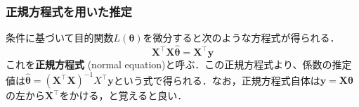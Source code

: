 \subsubsection{正規方程式を用いた推定}条件に基づいて目的関数$L(\mathbf{\theta})$を微分すると次のような方程式が得られる．
$$
\mathbf{X}^\top\mathbf{X}\mathbf{\hat\theta}=\mathbf{X}^\top\mathbf{y}
$$
これを\textbf{正規方程式} (normal equation)と呼ぶ．この正規方程式より、係数の推定値は$\mathbf{\hat\theta}={(\mathbf{X}^\top\mathbf{X})}^{-1}X^\top\mathbf{y}$という式で得られる．なお，正規方程式自体は$\mathbf{y}=\mathbf{X}\mathbf{\theta}$の左から$\mathbf{X}^\top$をかける，と覚えると良い．